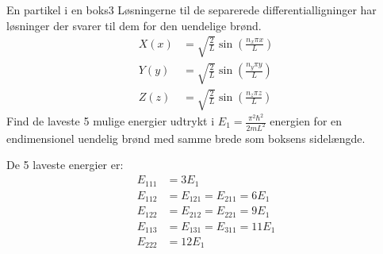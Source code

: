 \begin{opgave}{En partikel i en boks}{3}
Løsningerne til de separerede differentialligninger har løsninger der svarer til dem for den uendelige brønd.
\begin{align*}
    X(x)&=\sqrt{\frac{2}{L}}\sin\left(\frac{n_x\pi x}{L}\right)\\
    Y(y)&=\sqrt{\frac{2}{L}}\sin\left(\frac{n_y\pi y}{L}\right)\\
    Z(z)&=\sqrt{\frac{2}{L}}\sin\left(\frac{n_z\pi z}{L}\right)
\end{align*}
\opg Find de laveste 5 mulige energier udtrykt i $E_1 = \frac{\pi^2\hbar^2}{2mL^2}$ energien for en  endimensionel uendelig brønd med samme brede som boksens sidelængde.

De 5 laveste energier er:
\begin{align*}
    E_{111} &= 3E_1\\
    E_{112} &= E_{121} = E_{211} = 6E_1\\
    E_{122} &= E_{212} = E_{221} = 9E_1\\
    E_{113} &= E_{131} = E_{311} = 11E_1\\
    E_{222} &= 12E_1
\end{align*}
\end{opgave}
